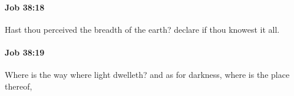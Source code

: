 		\paragraph{Job 38:18} %
			\label{JOB-38-18}

			Hast thou perceived the breadth of the earth? declare if thou knowest it all.


		\paragraph{Job 38:19} %
			\label{JOB-38-19}

			Where is the way where light dwelleth? and as for darkness, where is the place thereof,


